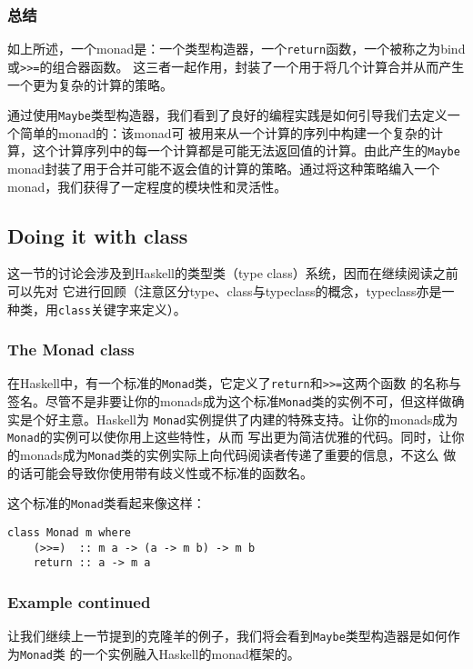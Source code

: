 \subsubsection{总结}
\indent{}如上所述，一个monad是：一个类型构造器，一个\texttt{return}函数，一个被称之为bind或\texttt{>>=}的组合器函数。
这三者一起作用，封装了一个用于将几个计算合并从而产生一个更为复杂的计算的策略。

\indent{}通过使用\texttt{Maybe}类型构造器，我们看到了良好的编程实践是如何引导我们去定义一个简单的monad的：该monad可
被用来从一个计算的序列中构建一个复杂的计算，这个计算序列中的每一个计算都是可能无法返回值的计算。由此产生的\texttt{Maybe}
monad封装了用于合并可能不返会值的计算的策略。通过将这种策略编入一个monad，我们获得了一定程度的模块性和灵活性。
\clearpage

\subsection{Doing it with class}
这一节的讨论会涉及到Haskell的类型类（type class）系统，因而在继续阅读之前可以先对
它进行回顾（注意区分type、class与typeclass的概念，typeclass亦是一种类，用\texttt{class}关键字来定义）。

\subsubsection{The Monad class}\label{subsec:minimal_definition}
\indent{}在Haskell中，有一个标准的\texttt{Monad}类，它定义了\texttt{return}和\texttt{>>=}这两个函数
的名称与签名。尽管不是非要让你的monads成为这个标准\texttt{Monad}类的实例不可，但这样做确实是个好主意。Haskell为
\texttt{Monad}实例提供了内建的特殊支持。让你的monads成为\texttt{Monad}的实例可以使你用上这些特性，从而
写出更为简洁优雅的代码。同时，让你的monads成为\texttt{Monad}类的实例实际上向代码阅读者传递了重要的信息，不这么
做的话可能会导致你使用带有歧义性或不标准的函数名。

\indent{}这个标准的\texttt{Monad}类看起来像这样：
\begin{verbatim}
class Monad m where
    (>>=)  :: m a -> (a -> m b) -> m b
    return :: a -> m a
\end{verbatim}

\vspace{-0.7em}
\subsubsection{Example continued}
\indent{}让我们继续上一节提到的克隆羊的例子，我们将会看到\texttt{Maybe}类型构造器是如何作为\texttt{Monad}类
的一个实例融入Haskell的monad框架的。

